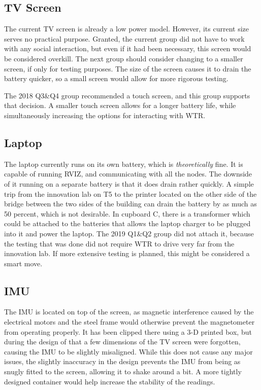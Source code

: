 \subsection{TV Screen}
The current TV screen is already a low power model.
However, its current size serves no practical purpose.
Granted, the current group did not have to work with any social interaction, but even if it had been necessary, this screen would be considered overkill.
The next group should consider changing to a smaller screen, if only for testing purposes.
The size of the screen causes it to drain the battery quicker, so a small screen would allow for more rigorous testing.

The 2018 Q3\&Q4 group recommended a touch screen, and this group supports that decision.
A smaller touch screen allows for a longer battery life, while simultaneously increasing the options for interacting with WTR.

\subsection{Laptop}
The laptop currently runs on its own battery, which is \textit{theoretically} fine.
It is capable of running RVIZ, and communicating with all the nodes.
The downside of it running on a separate battery is that it does drain rather quickly.
A simple trip from the innovation lab on T5 to the printer located on the other side of the bridge between the two sides of the building can drain the battery by as much as 50 percent, which is not desirable.
In cupboard C, there is a transformer which could be attached to the batteries that allows the laptop charger to be plugged into it and power the laptop.
The 2019 Q1\&Q2 group did not attach it, because the testing that was done did not require WTR to drive very far from the innovation lab.
If more extensive testing is planned, this might be considered a smart move.

\subsection{IMU}
The IMU is located on top of the screen, as magnetic interference caused by the electrical motors and the steel frame would otherwise prevent the magnetometer from operating properly.
It has been clipped there using a 3-D printed box, but during the design of that a few dimensions of the TV screen were forgotten, causing the IMU to be slightly misaligned.
While this does not cause any major issues, the slightly inaccuracy in the design prevents the IMU from being as snugly fitted to the screen, allowing it to shake around a bit.
A more tightly designed container would help increase the stability of the readings.

\newpage
